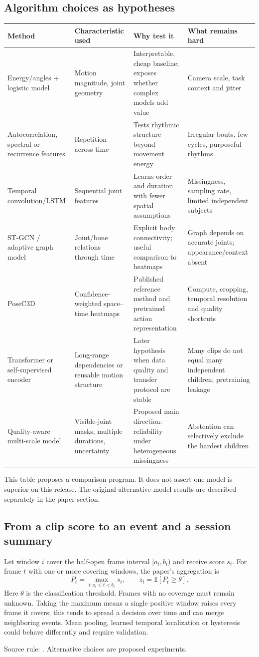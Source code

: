 \subsection{Algorithm choices as hypotheses}
\begin{longtable}{@{}P{.20\linewidth}P{.25\linewidth}P{.25\linewidth}P{.22\linewidth}@{}}\toprule
Method & Characteristic used & Why test it & What remains hard\\\midrule\endhead
Energy/angles + logistic model & Motion magnitude, joint geometry & Interpretable, cheap baseline; exposes whether complex models add value & Camera scale, task context and jitter\\
Autocorrelation, spectral or recurrence features & Repetition across time & Tests rhythmic structure beyond movement energy & Irregular bouts, few cycles, purposeful rhythms\\
Temporal convolution/LSTM & Sequential joint features & Learns order and duration with fewer spatial assumptions & Missingness, sampling rate, limited independent subjects\\
ST-GCN / adaptive graph model & Joint/bone relations through time & Explicit body connectivity; useful comparison to heatmaps & Graph depends on accurate joints; appearance/context absent\\
PoseC3D & Confidence-weighted space--time heatmaps & Published reference method and pretrained action representation & Compute, cropping, temporal resolution and quality shortcuts\\
Transformer or self-supervised encoder & Long-range dependencies or reusable motion structure & Later hypothesis when data quality and transfer protocol are stable & Many clips do not equal many independent children; pretraining leakage\\
Quality-aware multi-scale model & Visible-joint masks, multiple durations, uncertainty & Proposed main direction: reliability under heterogeneous missingness & Abstention can selectively exclude the hardest children\\\bottomrule
\end{longtable}
This table proposes a comparison program. It does not assert one model is superior on this release. The original alternative-model results are described separately in the paper section.

\subsection{From a clip score to an event and a session summary}
Let window $i$ cover the half-open frame interval $[a_i,b_i)$ and receive score $s_i$. For frame $t$ with one or more covering windows, the paper's aggregation is
\[
P_t=\max_{i:a_i\leq t<b_i}s_i,\qquad z_t=\mathbb{1}[P_t\geq\theta].
\]
Here $\theta$ is the classification threshold. Frames with no coverage must remain unknown. Taking the maximum means a single positive window raises every frame it covers; this tends to spread a decision over time and can merge neighboring events. Mean pooling, learned temporal localization or hysteresis could behave differently and require validation.\par
Source rule: \cite[p.~4]{barami2024}. Alternative choices are proposed experiments.

